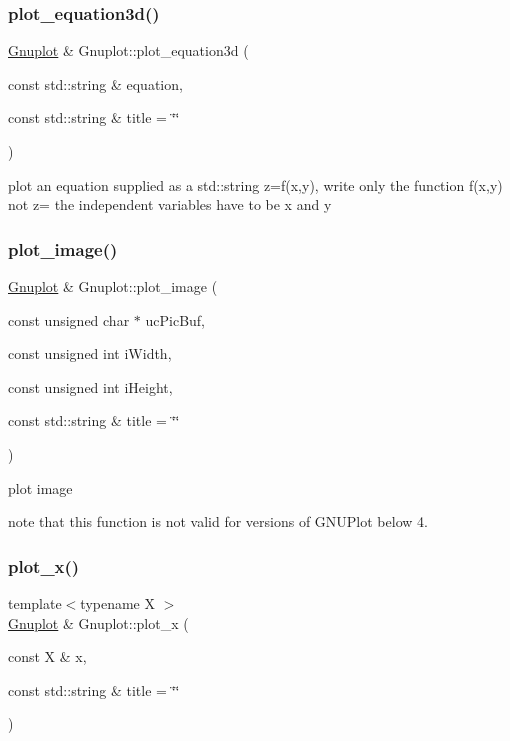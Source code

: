 \subsubsection{\texorpdfstring{plot\+\_\+equation3d()}{plot\_equation3d()}}
{\footnotesize\ttfamily \mbox{\hyperlink{class_gnuplot}{Gnuplot}} \& Gnuplot\+::plot\+\_\+equation3d (\begin{DoxyParamCaption}\item[{const std\+::string \&}]{equation,  }\item[{const std\+::string \&}]{title = {\ttfamily \char`\"{}\char`\"{}} }\end{DoxyParamCaption})}

plot an equation supplied as a std\+::string z=f(x,y), write only the function f(x,y) not z= the independent variables have to be x and y \mbox{\label{class_gnuplot_aae22c0470a6fbbc1f5e84dec8d023381}} 
\subsubsection{\texorpdfstring{plot\+\_\+image()}{plot\_image()}}
{\footnotesize\ttfamily \mbox{\hyperlink{class_gnuplot}{Gnuplot}} \& Gnuplot\+::plot\+\_\+image (\begin{DoxyParamCaption}\item[{const unsigned char $\ast$}]{uc\+Pic\+Buf,  }\item[{const unsigned int}]{i\+Width,  }\item[{const unsigned int}]{i\+Height,  }\item[{const std\+::string \&}]{title = {\ttfamily \char`\"{}\char`\"{}} }\end{DoxyParamCaption})}



plot image 


\begin{DoxyItemize}
\item note that this function is not valid for versions of G\+N\+U\+Plot below 4. 
\end{DoxyItemize}\mbox{\label{class_gnuplot_a80f3b2baae2bceff78ad005d9c3ec3fb}} 
\subsubsection{\texorpdfstring{plot\+\_\+x()}{plot\_x()}}
{\footnotesize\ttfamily template$<$typename X $>$ \\
\mbox{\hyperlink{class_gnuplot}{Gnuplot}} \& Gnuplot\+::plot\+\_\+x (\begin{DoxyParamCaption}\item[{const X \&}]{x,  }\item[{const std\+::string \&}]{title = {\ttfamily \char`\"{}\char`\"{}} }\end{DoxyParamCaption})}



